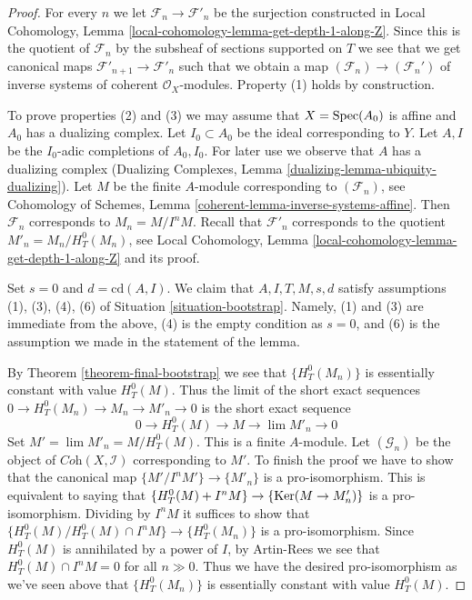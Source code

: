 \begin{proof}
For every $n$ we let $\mathcal{F}_n \to \mathcal{F}'_n$ be the surjection
constructed in
Local Cohomology, Lemma \ref{local-cohomology-lemma-get-depth-1-along-Z}.
Since this is the quotient of $\mathcal{F}_n$ by the subsheaf
of sections supported on $T$ we see that we get canonical maps
$\mathcal{F}'_{n + 1} \to \mathcal{F}'_n$ such that we obtain
a map $(\mathcal{F}_n) \to (\mathcal{F}_n')$
of inverse systems of coherent $\mathcal{O}_X$-modules.
Property (1) holds by construction.

\medskip\noindent
To prove properties (2) and (3) we may assume that $X = \mathop{\mathrm{Spec}}(A_0)$ is
affine and $A_0$ has a dualizing complex. Let $I_0 \subset A_0$ be the
ideal corresponding to $Y$. Let $A, I$ be the $I_0$-adic completions of
$A_0, I_0$. For later use we observe that $A$ has a dualizing complex
(Dualizing Complexes, Lemma \ref{dualizing-lemma-ubiquity-dualizing}).
Let $M$ be the finite $A$-module corresponding to $(\mathcal{F}_n)$, see
Cohomology of Schemes, Lemma \ref{coherent-lemma-inverse-systems-affine}.
Then $\mathcal{F}_n$ corresponds to $M_n = M/I^nM$. Recall that
$\mathcal{F}'_n$ corresponds to the quotient $M'_n = M_n / H^0_T(M_n)$,
see Local Cohomology, Lemma \ref{local-cohomology-lemma-get-depth-1-along-Z}
and its proof.

\medskip\noindent
Set $s = 0$ and $d = \text{cd}(A, I)$.
We claim that $A, I, T, M, s, d$ satisfy assumptions (1), (3), (4), (6)
of Situation \ref{situation-bootstrap}.
Namely, (1) and (3) are immediate from the above, (4) is
the empty condition as $s = 0$, and (6) is the assumption
we made in the statement of the lemma.

\medskip\noindent
By Theorem \ref{theorem-final-bootstrap} we see that $\{H^0_T(M_n)\}$
is essentially constant with value $H^0_T(M)$. Thus the limit of the
short exact sequences $0 \to H^0_T(M_n) \to M_n \to M'_n \to 0$
is the short exact sequence
$$
0 \to H^0_T(M) \to M \to \lim M'_n \to 0
$$
Set $M' = \lim M'_n = M/H^0_T(M)$. This is a finite $A$-module.
Let $(\mathcal{G}_n)$ be the object of $\textit{Coh}(X, \mathcal{I})$
corresponding to $M'$. To finish the proof we have to show that the
canonical map $\{M'/I^nM'\} \to \{M'_n\}$ is a pro-isomorphism.
This is equivalent to saying that
$\{H^0_T(M) + I^nM\} \to \{\mathop{\mathrm{Ker}}(M \to M'_n)\}$ is a
pro-isomorphism. Dividing by $I^nM$ it suffices to show that
$\{H^0_T(M)/H^0_T(M) \cap I^nM\} \to \{H^0_T(M_n)\}$
is a pro-isomorphism. Since $H^0_T(M)$ is annihilated by a power
of $I$, by Artin-Rees we see that $H^0_T(M) \cap I^nM = 0$
for all $n \gg 0$. Thus we have the desired pro-isomorphism
as we've seen above that $\{H^0_T(M_n)\}$
is essentially constant with value $H^0_T(M)$.
\end{proof}

